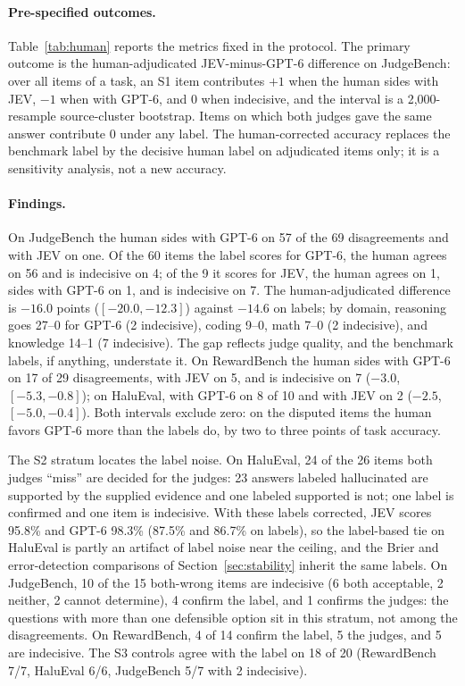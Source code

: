 \documentclass[11pt]{article}
\begin{document}
\paragraph{Pre-specified outcomes.}
Table~\ref{tab:human} reports the metrics fixed in the protocol. The primary outcome is the human-adjudicated JEV-minus-GPT-6 difference on JudgeBench: over all items of a task, an S1 item contributes $+1$ when the human sides with JEV, $-1$ when with GPT-6, and 0 when indecisive, and the interval is a 2,000-resample source-cluster bootstrap. Items on which both judges gave the same answer contribute 0 under any label. The human-corrected accuracy replaces the benchmark label by the decisive human label on adjudicated items only; it is a sensitivity analysis, not a new accuracy.

\paragraph{Findings.}
On JudgeBench the human sides with GPT-6 on 57 of the 69 disagreements and with JEV on one. Of the 60 items the label scores for GPT-6, the human agrees on 56 and is indecisive on 4; of the 9 it scores for JEV, the human agrees on 1, sides with GPT-6 on 1, and is indecisive on 7. The human-adjudicated difference is $-16.0$ points ($[-20.0,-12.3]$) against $-14.6$ on labels; by domain, reasoning goes 27--0 for GPT-6 (2 indecisive), coding 9--0, math 7--0 (2 indecisive), and knowledge 14--1 (7 indecisive). The gap reflects judge quality, and the benchmark labels, if anything, understate it. On RewardBench the human sides with GPT-6 on 17 of 29 disagreements, with JEV on 5, and is indecisive on 7 ($-3.0$, $[-5.3,-0.8]$); on HaluEval, with GPT-6 on 8 of 10 and with JEV on 2 ($-2.5$, $[-5.0,-0.4]$). Both intervals exclude zero: on the disputed items the human favors GPT-6 more than the labels do, by two to three points of task accuracy.

The S2 stratum locates the label noise. On HaluEval, 24 of the 26 items both judges ``miss'' are decided for the judges: 23 answers labeled hallucinated are supported by the supplied evidence and one labeled supported is not; one label is confirmed and one item is indecisive. With these labels corrected, JEV scores 95.8\% and GPT-6 98.3\% (87.5\% and 86.7\% on labels), so the label-based tie on HaluEval is partly an artifact of label noise near the ceiling, and the Brier and error-detection comparisons of Section~\ref{sec:stability} inherit the same labels. On JudgeBench, 10 of the 15 both-wrong items are indecisive (6 both acceptable, 2 neither, 2 cannot determine), 4 confirm the label, and 1 confirms the judges: the questions with more than one defensible option sit in this stratum, not among the disagreements. On RewardBench, 4 of 14 confirm the label, 5 the judges, and 5 are indecisive. The S3 controls agree with the label on 18 of 20 (RewardBench 7/7, HaluEval 6/6, JudgeBench 5/7 with 2 indecisive).
\end{document}
